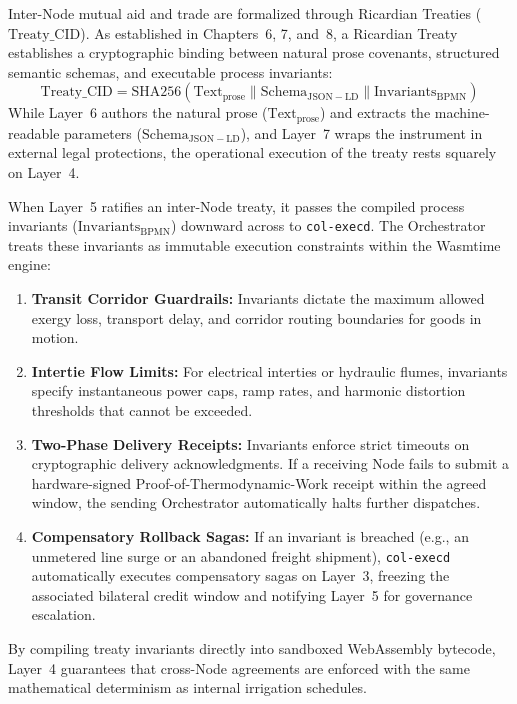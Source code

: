 Inter-Node mutual aid and trade are formalized through Ricardian Treaties ($\mathrm{Treaty\_CID}$). As established in Chapters~6, 7, and~8, a Ricardian Treaty establishes a cryptographic binding between natural prose covenants, structured semantic schemas, and executable process invariants:
\begin{equation}
\mathrm{Treaty\_CID} = \mathrm{SHA256}\left(\mathrm{Text}_{\mathrm{prose}} \parallel \mathrm{Schema}_{\mathrm{JSON-LD}} \parallel \mathrm{Invariants}_{\mathrm{BPMN}}\right)
\label{eq:ch5_treaty_cid}
\end{equation}
While Layer~6 authors the natural prose ($\mathrm{Text}_{\mathrm{prose}}$) and extracts the machine-readable parameters ($\mathrm{Schema}_{\mathrm{JSON-LD}}$), and Layer~7 wraps the instrument in external legal protections, the operational execution of the treaty rests squarely on Layer~4.

When Layer~5 ratifies an inter-Node treaty, it passes the compiled process invariants ($\mathrm{Invariants}_{\mathrm{BPMN}}$) downward across  to \texttt{col-execd}. The Orchestrator treats these invariants as immutable execution constraints within the Wasmtime engine:
\begin{enumerate}
  \item \textbf{Transit Corridor Guardrails:} Invariants dictate the maximum allowed exergy loss, transport delay, and corridor routing boundaries for goods in motion.
  \item \textbf{Intertie Flow Limits:} For electrical interties or hydraulic flumes, invariants specify instantaneous power caps, ramp rates, and harmonic distortion thresholds that cannot be exceeded.
  \item \textbf{Two-Phase Delivery Receipts:} Invariants enforce strict timeouts on cryptographic delivery acknowledgments. If a receiving Node fails to submit a hardware-signed Proof-of-Thermodynamic-Work receipt within the agreed window, the sending Orchestrator automatically halts further dispatches.
  \item \textbf{Compensatory Rollback Sagas:} If an invariant is breached (e.g., an unmetered line surge or an abandoned freight shipment), \texttt{col-execd} automatically executes compensatory sagas on Layer~3, freezing the associated bilateral credit window and notifying Layer~5 for governance escalation.
\end{enumerate}
By compiling treaty invariants directly into sandboxed WebAssembly bytecode, Layer~4 guarantees that cross-Node agreements are enforced with the same mathematical determinism as internal irrigation schedules.

